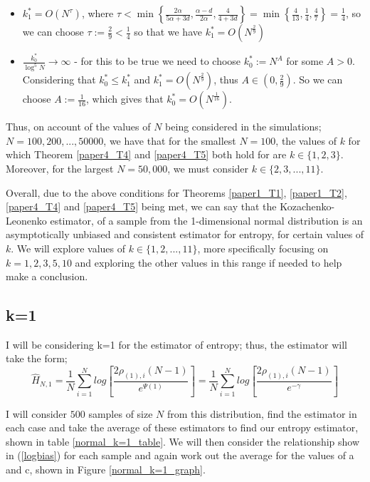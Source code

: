 \documentclass{report}
\begin{document}
\begin{itemize}
\item $k_{1}^{*} = O(N^{\tau})$, where $\tau < \min \left\{ \frac{2 \alpha}{5 \alpha + 3d} , \frac{\alpha - d}{2 \alpha} , \frac{4}{4 + 3d} \right\} = \min \left\{ \frac{4}{13}, \frac{1}{4}, \frac{4}{7} \right\} = \frac{1}{4}$, so we can choose $\tau := \frac{2}{9} < \frac{1}{4}$ so that we have $k_{1}^{*} = O(N^{\frac{2}{9}})$

\item $\frac{k_{0}^{*}}{\log^{5}{N}} \to \infty$ - for this to be true we need to choose $k_{0}^{*} := N^A$ for some $A>0$. Considering that $k_{0}^{*} \leq k_{1}^{*}$ and $ k_{1}^{*} = O(N^{\frac{2}{9}})$, thus $A \in (0, \frac{2}{9})$. So we can choose $A := \frac{1}{16}$, which gives that $k_{0}^{*} = O(N^{\frac{1}{16}})$.
\end{itemize}

Thus, on account of the values of $N$ being considered in the simulations; $N=100, 200, ..., 50000$, we have that for the smallest $N=100$, the values of $k$ for which Theorem \ref{paper4_T4} and \ref{paper4_T5} both hold for are $k \in \{1, 2, 3\}$. Moreover, for the largest $N=50,000$, we must consider $k \in \{2, 3, ..., 11\}$.

Overall, due to the above conditions for Theorems \ref{paper1_T1}, \ref{paper1_T2}, \ref{paper4_T4} and \ref{paper4_T5} being met, we can say that the Kozachenko-Leonenko estimator, of a sample from the 1-dimensional normal distribution is an asymptotically unbiased and consistent estimator for entropy, for certain values of $k$. We will explore values of $k \in \{1, 2, ..., 11\}$, more specifically focusing on $k=1, 2, 3, 5, 10$ and exploring the other values in this range if needed to help make a conclusion.




\subsection{k=1} \label{N_k=1}
I will be considering k=1 for the estimator of entropy; thus, the estimator will take the form;
\begin{equation} 
\hat{H}_{N, 1} = \frac{1}{N} \sum_{i=1}^{N} log \left[ \frac{2\rho_{(1),i} (N-1)}{e^{\Psi(1)}} \right] = \frac{1}{N} \sum_{i=1}^{N} log \left[ \frac{2\rho_{(1),i} (N-1)}{e^{-\gamma}} \right] \nonumber
\end{equation}

I will consider $500$ samples of size $N$ from this distribution, find the estimator in each case and take the average of these estimators to find our entropy estimator, shown in table \ref{normal_k=1_table}. We will then consider the relationship show in (\ref{logbias}) for each sample and again work out the average for the values of a and c, shown in Figure \ref{normal_k=1_graph}.
\end{document}
